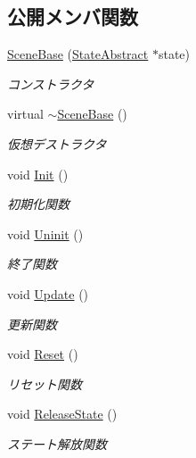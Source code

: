\subsection*{公開メンバ関数}
\begin{DoxyCompactItemize}
\item 
\mbox{\hyperlink{class_scene_base_a0994a1f821d08732f78b7b7b71d3fcc4}{Scene\+Base}} (\mbox{\hyperlink{class_scene_base_1_1_state_abstract}{State\+Abstract}} $\ast$state)
\begin{DoxyCompactList}\small\item\em コンストラクタ \end{DoxyCompactList}\item 
virtual \mbox{\hyperlink{class_scene_base_a187dd160e5a16909bcc6529851e38318}{$\sim$\+Scene\+Base}} ()
\begin{DoxyCompactList}\small\item\em 仮想デストラクタ \end{DoxyCompactList}\item 
void \mbox{\hyperlink{class_scene_base_a494ba624fdd95b296e4487ed1a34f47b}{Init}} ()
\begin{DoxyCompactList}\small\item\em 初期化関数 \end{DoxyCompactList}\item 
void \mbox{\hyperlink{class_scene_base_aa4babf42cf2c2b6e17bb3ddd6ff13d31}{Uninit}} ()
\begin{DoxyCompactList}\small\item\em 終了関数 \end{DoxyCompactList}\item 
void \mbox{\hyperlink{class_scene_base_a71f332a32d99548b3aa912210a2dd0b0}{Update}} ()
\begin{DoxyCompactList}\small\item\em 更新関数 \end{DoxyCompactList}\item 
void \mbox{\hyperlink{class_scene_base_ae2dc09554ec21ffe231fa73a6cdd7ca1}{Reset}} ()
\begin{DoxyCompactList}\small\item\em リセット関数 \end{DoxyCompactList}\item 
void \mbox{\hyperlink{class_scene_base_aaa1e66fbfc6740b069d715b325915b97}{Release\+State}} ()
\begin{DoxyCompactList}\small\item\em ステート解放関数 \end{DoxyCompactList}\item 

\end{DoxyCompactItemize}
